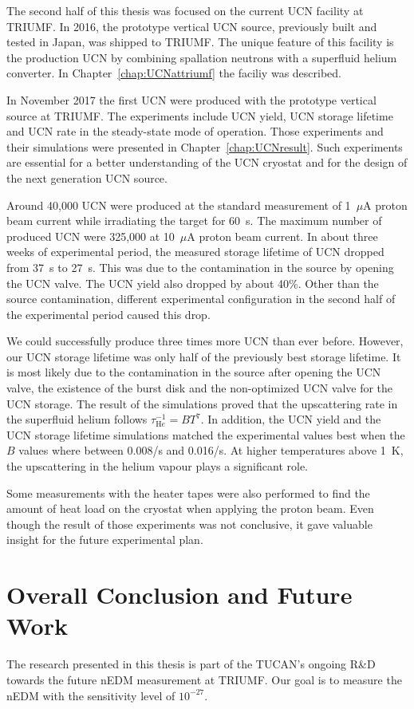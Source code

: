 The second half of this thesis was focused on the current UCN facility
at TRIUMF. In 2016, the prototype vertical UCN source, previously built
and tested in Japan, was shipped to TRIUMF. The unique feature of this
facility is the production UCN by combining spallation neutrons with a superfluid
helium converter. In Chapter~\ref{chap:UCNattriumf} the faciliy was
described.

In November 2017 the first UCN were produced with the prototype
vertical source at TRIUMF. The experiments include UCN yield, UCN
storage lifetime and UCN rate in the steady-state mode of operation.
Those experiments and their simulations were presented in
Chapter~\ref{chap:UCNresult}. Such experiments are essential for a
better understanding of the UCN cryostat and for the design of the
next generation UCN source.

Around 40,000 UCN were produced at the standard measurement of
1~$\mu$A proton beam current while irradiating the target for
60~s. The maximum number of produced UCN were 325,000 at 10~$\mu$A
proton beam current. In about three weeks of experimental period, the
measured storage lifetime of UCN dropped from 37~s to 27~s. This was
due to the contamination in the source by opening the UCN valve. The
UCN yield also dropped by about 40\%. Other than the source
contamination, different experimental configuration in the second half
of the experimental period caused this drop.

We could successfully produce three times more UCN than ever
before. However, our UCN storage lifetime was only half of the
previously best storage lifetime. It is most likely due to the
contamination in the source after opening the UCN valve, the existence
of the burst disk and the non-optimized UCN valve for the UCN
storage. The result of the simulations proved that the upscattering
rate in the superfluid helium follows
$\tau^{-1}_{\mathrm He} = B T^7$. In addition, the UCN yield and the
UCN storage lifetime simulations matched the experimental values best
when the $B$ values where between 0.008/s and 0.016/s. At higher
temperatures above 1~K, the upscattering in the helium vapour plays a
significant role.

Some measurements with the heater tapes were also performed to find
the amount of heat load on the cryostat when applying the proton
beam. Even though the result of those experiments was not conclusive,
it gave valuable insight for the future experimental plan.


\section{Overall Conclusion and Future Work}
The research presented in this thesis is part of the TUCAN's ongoing
R\&D towards the future nEDM measurement at TRIUMF. Our goal is to
measure the nEDM with the sensitivity level of $10^{-27}$.

